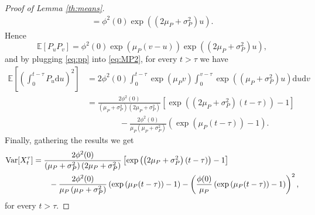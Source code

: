 \documentclass[12pt,centertags,reqno]{amsart}
\numberwithin{equation}{section} \makeatletter
\newcommand{\ud}{\mathrm d}
\newcommand{\esp}[2][\mathbb E] {#1\left[#2\right]}
\begin{document}
\begin{proof}[Proof of Lemma \ref{th:means}]
\begin{align*}
=\phi^2(0)\exp\left(\left(2\mu_{P}+\sigma_{P}^{2}\right)u\right).
\end{align*}
Hence
\begin{equation} \label{eq:pp}
\esp{P_{u}P_{v}}=\phi^2(0)\exp\left(\mu_{P}(v-u)\right)\exp\left(\left(2\mu_{P}+\sigma_{P}^{2}\right)u\right),
\end{equation}
and by plugging \eqref{eq:pp} into \eqref{eq:MP2}, for every $t > \tau$ we have
\begin{align*}
\esp{\left(\int_0^{t-\tau} P_u \ud u\right)^{2}}
& = %
2\phi^2(0)\int_{0}^{t-\tau}\exp\left(\mu_{P}v\right) \int_{0}^{v-\tau}\exp\left(\left(\mu_{P}+\sigma_{P}^{2}\right)u\right) \ud u\ud v\\
&  = \frac{2\phi^{2}(0)}{\left(\mu_{P}+\sigma_{P}^{2}\right)\left(2\mu_{P}+\sigma_{P}^{2}\right)}\left[\exp\left(\left(2\mu_{P}+\sigma_{P}^{2}\right)(t-\tau)\right) -1\right]\\
& \qquad \qquad -\frac{2\phi^{2}(0)}{\mu_{P}\left(\mu_{P}+\sigma_{P}^{2}\right)}\left(\exp\left(\mu_{P}(t-\tau)\right) -1\right).
\end{align*}
Finally, gathering the results we get
\begin{align*}
{\rm Var}[X_t^\tau] & = %
\frac{2\phi^{2}(0)}{\left(\mu_{P}+\sigma_{P}^{2}\right)\left(2\mu_{P}+\sigma_{P}^{2}\right)}\left[\exp\left(\left(2\mu_{P}+\sigma_{P}^{2}\right)(t-\tau)\right) -1\right] \\
& \qquad - \frac{2\phi^{2}(0)}{\mu_{P}\left(\mu_{P}+\sigma_{P}^{2}\right)}\left(\exp\left(\mu_{P}(t-\tau)\right) -1\right)-\left(\frac{\phi(0)}{\mu_{P}}\left(\exp\left(\mu_{P}(t-\tau)\right) -1\right)\right)^2,
\end{align*}
for every $t > \tau$.
\end{proof}
\end{document}
